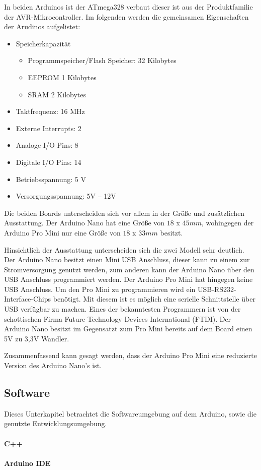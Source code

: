 In beiden Arduinos ist der ATmega328 verbaut dieser ist aus der Produktfamilie der AVR-Mikrocontroller. Im folgenden werden die gemeinsamen Eigenschaften der Arudinos aufgelistet: 
\begin{itemize}
	\item Speicherkapazität
	\begin{itemize}
		\item Programmspeicher/Flash Speicher: 32 Kilobytes
		\item EEPROM 1 Kilobytes
		\item SRAM 2 Kilobytes
	\end{itemize}
	\item Taktfrequenz: 16 MHz
	\item Externe Interrupts: 2
	\item Analoge I/O Pins: 8
	\item Digitale I/O Pins: 14
	\item Betriebsspannung: 5 V
	\item Versorgungsspannung: 5V – 12V
\end{itemize}
Die beiden Boards unterscheiden sich vor allem in der Größe und zusätzlichen Ausstattung.  Der Arduino Nano hat eine Größe von $18$ x $45 mm$, wohingegen der Arduino Pro Mini nur eine Größe von $18$ x $33 mm$ besitzt.

Hinsichtlich der Ausstattung unterscheiden sich die zwei Modell  sehr deutlich. Der Arduino Nano besitzt einen Mini USB Anschluss, dieser kann zu einem zur Stromversorgung genutzt werden, zum anderen kann der Arduino Nano über den USB Anschluss programmiert werden. Der Arduino Pro Mini hat hingegen keine USB Anschluss. Um den Pro Mini zu programmieren wird ein USB-RS232-Interface-Chips benötigt. Mit diesem ist es möglich eine serielle Schnittstelle über USB verfügbar zu machen. Eines der bekanntesten Programmern ist von der schottischen Firma Future Technology Devices International (FTDI). Der Arduino Nano besitzt im Gegensatzt zum Pro Mini bereits auf dem Board einen 5V zu 3,3V Wandler. 

Zusammenfassend kann gesagt werden, dass der Arduino Pro Mini eine reduzierte Version des Arduino Nano’s ist.  


\subsection{Software}
Dieses Unterkapitel betrachtet die Softwareumgebung auf dem Arduino, sowie die genutzte Entwicklungsumgebung.
\paragraph{C++}
\paragraph{Arduino IDE}
